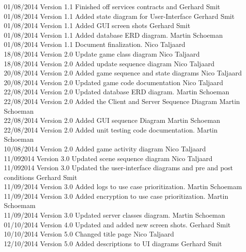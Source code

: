 \documentclass[letterpaper]{article}
\begin{document}
\begin{tabbing}
			01/08/2014  \> Version 1.1  \> Finished off services contracts and 			\> Gerhard Smit\\
			01/08/2014	\> Version 1.1	\> Added state diagram for User-Interface 		\> Gerhard Smit\\
			01/08/2014  \> Version 1.1  \> Added GUI screen shots						\> Gerhard Smit\\
			01/08/2014  \> Version 1.1  \> Added database ERD diagram.					\> Martin Schoeman\\
			01/08/2014  \> Version 1.1  \> Document finalization.						\> Nico Taljaard\\
			18/08/2014  \> Version 2.0  \> Update game class diagram					\> Nico Taljaard\\
			18/08/2014  \> Version 2.0  \> Added update sequence diagram				\> Nico Taljaard\\
			20/08/2014  \> Version 2.0  \> Added game sequence and state diagrams		\> Nico Taljaard\\
			20/08/2014  \> Version 2.0  \> Updated game code documentation				\> Nico Taljaard\\
			22/08/2014  \> Version 2.0  \> Updated database ERD diagram.				\> Martin Schoeman\\
			22/08/2014  \> Version 2.0  \> Added the Client and Server Sequence Diagram	\> Martin Schoeman\\
			22/08/2014  \> Version 2.0  \> Added GUI sequence Diagram					\> Martin Schoeman\\
			22/08/2014  \> Version 2.0  \> Added unit testing code documentation.		\> Martin Schoeman\\
			10/08/2014	\> Version 2.0	\> Added game activity diagram					\> Nico Taljaard\\
			11/092014	\> Version 3.0	\> Updated scene sequence diagram				\> Nico Taljaard\\
			11/092014	\> Version 3.0	\> Updated the user-interface diagrams and pre and post conditions			\> Gerhard Smit\\
			11/09/2014	\> Version 3.0  \> Added logs to use case prioritization.		\> Martin Schoemam\\
			11/09/2014	\> Version 3.0  \> Added encryption to use case prioritization.	\> Martin Schoemam\\
			11/09/2014	\> Version 3.0	\> Updated server classes diagram.				\> Martin Schoeman\\
			01/10/2014  \> Version 4.0	\> Updated and added new screen shots.			\> Gerhard Smit \\
			10/10/2014	\> Version 5.0	\> Changed title page							\> Nico Taljaard\\
			12/10/2014	\> Version 5.0	\> Added descriptions to UI diagrams				\> Gerhard Smit \\
			
		\end{tabbing}
		
\end{document}
